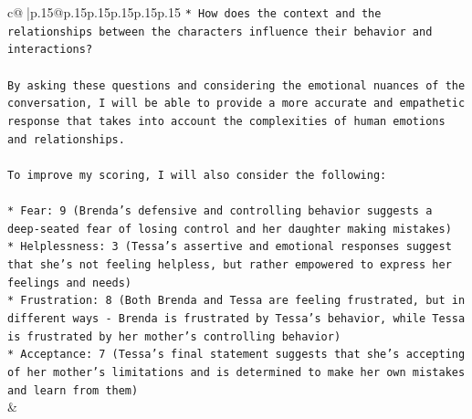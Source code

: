 \documentclass{article}
\begin{document}
{\begin{supertabular}{c@{$\;$}|p{.15\linewidth}@{}p{.15\linewidth}p{.15\linewidth}p{.15\linewidth}p{.15\linewidth}p{.15\linewidth}}
{{{\texttt{* How does the context and the relationships between the characters influence their behavior and interactions?} \\
\\ 
\texttt{By asking these questions and considering the emotional nuances of the conversation, I will be able to provide a more accurate and empathetic response that takes into account the complexities of human emotions and relationships.} \\
\\ 
\texttt{To improve my scoring, I will also consider the following:} \\
\\ 
\texttt{* Fear: 9 (Brenda's defensive and controlling behavior suggests a deep{-}seated fear of losing control and her daughter making mistakes)} \\
\texttt{* Helplessness: 3 (Tessa's assertive and emotional responses suggest that she's not feeling helpless, but rather empowered to express her feelings and needs)} \\
\texttt{* Frustration: 8 (Both Brenda and Tessa are feeling frustrated, but in different ways {-} Brenda is frustrated by Tessa's behavior, while Tessa is frustrated by her mother's controlling behavior)} \\
\texttt{* Acceptance: 7 (Tessa's final statement suggests that she's accepting of her mother's limitations and is determined to make her own mistakes and learn from them)} \\
            }
        }
    }
    & \\ \\

\end{supertabular}
}
\end{document}
